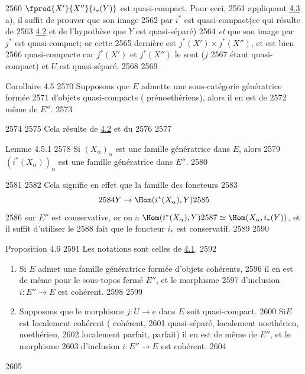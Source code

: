   2560	$\fprod{X'}{X''}{i_{\ast}(Y)}$ est quasi-compact. Pour ceci,
  2561	appliquant \hyperref[VI.cor4.3]{4.3} a), il suffit de prouver que son image
  2562	par $i^{\ast}$ est quasi-compact\pageoriginale (ce qui résulte de
  2563	\hyperref[VI.prop4.2]{4.2} et de l'hypothèse que $Y$ est quasi-séparé)
  2564	\emph{et} que son image par $j^{\ast}$ est quasi-compact; or cette
  2565	dernière est $j^{\ast}(X')\times j^{\ast}(X'')$, et est bien
  2566	quasi-compacte car $j^{\ast}(X')$ et $j^{\ast}(X'')$ le sont ($j$
  2567	étant quasi-compact) et $U$ est quasi-séparé.
  2568	
  2569	\begin{enonce*}{Corollaire 4.5}
  2570	Supposons que $E$ admette une sous-catégorie génératrice formée
  2571	d'objets quasi-compacts (\emph{\resp} prénoethériens), alors il en est de
  2572	même de $E''$.
  2573	\end{enonce*}
  2574	
  2575	Cela résulte de \hyperref[VI.prop4.2]{4.2} et du
  2576	
  2577	\begin{enonce*}{Lemme 4.5.1}
  2578	Si $(X_{\alpha})_{\alpha}$ est une famille génératrice dans $E$, alors
  2579	$(i^{\ast}(X_{\alpha}))_{\alpha}$ est une famille génératrice dans $E''$.
  2580	\end{enonce*}
  2581	
  2582	Cela signifie en effet que la famille des foncteurs
  2583	$$
  2584	Y \to \Hom (i^{\ast}(X_{\alpha}), Y)
  2585	$$
  2586	sur $E''$ est conservative, or on a $\Hom(i^{\ast}(X_{\alpha}), Y)
  2587	\simeq \Hom(X_{\alpha}, i_{\ast} (Y))$, et il suffit d'utiliser le
  2588	fait que le foncteur $i_{\ast}$ est conservatif.
  2589	
  2590	\begin{enonce*}{Proposition 4.6}
  2591	Les notations sont celles de \hyperref[VI.subsec4.1]{4.1}.
  2592	\begin{enumerate}
  2593	\renewcommand{\theenumi}{\alph{enumi}}
  2594	\renewcommand{\labelenumi}{\theenumi)}
  2595	\item Si $E$ admet une famille génératrice formée d'objets cohérents,
  2596	  il en est de même pour le sous-topos fermé $E''$, et le morphisme
  2597	  d'inclusion $i : E''\to E$ est cohérent.
  2598	
  2599	\item Supposons que le morphisme $j : U \to e$ dans $E$ soit quasi-compact.
  2600	Si\pageoriginale $E$ est localement cohérent (\emph{\resp} cohérent, \emph{\resp}
  2601	quasi-séparé, \emph{\resp} localement noethérien, \emph{\resp} noethérien,
  2602	\emph{\resp} localement parfait, \emph{\resp} parfait) il en est de même de $E''$, et le morphisme
  2603	d'inclusion $i : E''\to E$ est cohérent.
  2604	\end{enumerate}
  2605	\end{enonce*}
